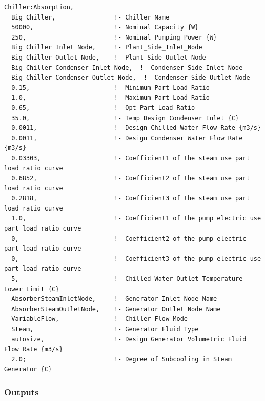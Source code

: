 \begin{lstlisting}
Chiller:Absorption,
  Big Chiller,                !- Chiller Name
  50000,                      !- Nominal Capacity {W}
  250,                        !- Nominal Pumping Power {W}
  Big Chiller Inlet Node,     !- Plant_Side_Inlet_Node
  Big Chiller Outlet Node,    !- Plant_Side_Outlet_Node
  Big Chiller Condenser Inlet Node,  !- Condenser_Side_Inlet_Node
  Big Chiller Condenser Outlet Node,  !- Condenser_Side_Outlet_Node
  0.15,                       !- Minimum Part Load Ratio
  1.0,                        !- Maximum Part Load Ratio
  0.65,                       !- Opt Part Load Ratio
  35.0,                       !- Temp Design Condenser Inlet {C}
  0.0011,                     !- Design Chilled Water Flow Rate {m3/s}
  0.0011,                     !- Design Condenser Water Flow Rate {m3/s}
  0.03303,                    !- Coefficient1 of the steam use part load ratio curve
  0.6852,                     !- Coefficient2 of the steam use part load ratio curve
  0.2818,                     !- Coefficient3 of the steam use part load ratio curve
  1.0,                        !- Coefficient1 of the pump electric use part load ratio curve
  0,                          !- Coefficient2 of the pump electric part load ratio curve
  0,                          !- Coefficient3 of the pump electric use part load ratio curve
  5,                          !- Chilled Water Outlet Temperature Lower Limit {C}
  AbsorberSteamInletNode,     !- Generator Inlet Node Name
  AbsorberSteamOutletNode,    !- Generator Outlet Node Name
  VariableFlow,               !- Chiller Flow Mode
  Steam,                      !- Generator Fluid Type
  autosize,                   !- Design Generator Volumetric Fluid Flow Rate {m3/s}
  2.0;                        !- Degree of Subcooling in Steam Generator {C}
\end{lstlisting}

\subsubsection{Outputs}\label{outputs-025}

